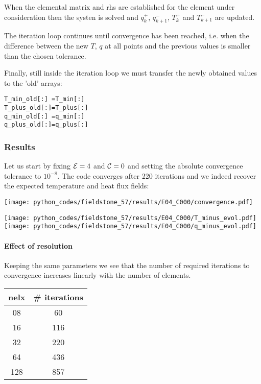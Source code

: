 When the elemental matrix and rhs are established for the element under consideration
then the systen is solved and $q_k^+$, $q_{k+1}^-$, $T_k^+$ and $T_{k+1}^-$ are updated.

The iteration loop continues until convergence has been reached, i.e.
when the difference between the new $T$, $q$ at all points and the previous
values is smaller than the chosen tolerance. 

Finally, still inside the iteration loop we must transfer the newly obtained values to the 
'old' arrays:
\begin{lstlisting}
T_min_old[:] =T_min[:]
T_plus_old[:]=T_plus[:]
q_min_old[:] =q_min[:]
q_plus_old[:]=q_plus[:]
\end{lstlisting}



\subsubsection*{Results}

Let us start by fixing ${\cal E}=4$ and ${\cal C}=0$ and setting the absolute convergence 
tolerance to $10^{-8}$. The code converges after 220 iterations and we indeed recover the 
expected temperature and heat flux fields:

\begin{center}
\texttt{[image: python\_codes/fieldstone\_57/results/E04\_C000/convergence.pdf]}
\end{center}

\begin{center}
\texttt{[image: python\_codes/fieldstone\_57/results/E04\_C000/T\_minus\_evol.pdf]}
\texttt{[image: python\_codes/fieldstone\_57/results/E04\_C000/q\_minus\_evol.pdf]}
\end{center}

\paragraph{Effect of resolution} Keeping the same parameters we see that the 
number of required iterations to convergence increases linearly with the number of elements.

\begin{center}
\begin{tabular}{cc}
\hline
nelx & \# iterations \\
\hline
08 &60  \\
16 &116 \\
32 &220 \\
64 &436 \\
128 & 857 \\
\hline
\end{tabular}
\end{center}


